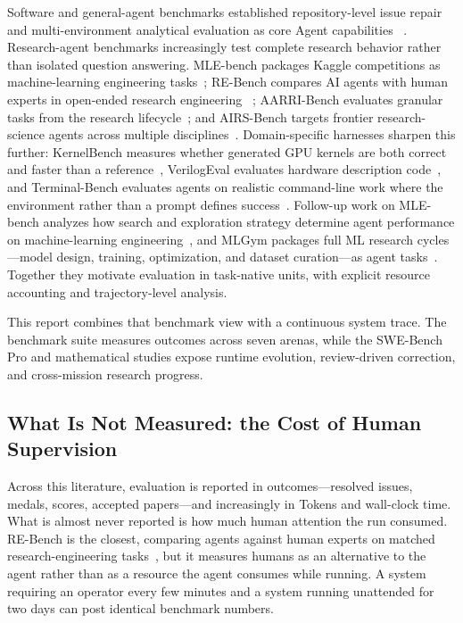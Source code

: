 Software and general-agent benchmarks established repository-level issue repair
and multi-environment analytical evaluation as core Agent capabilities
~\citep{jimenez2024swebench,liu2023agentbench,ma2024agentboard}.
Research-agent benchmarks increasingly test complete research behavior rather than
isolated question answering. MLE-bench packages Kaggle competitions as
machine-learning engineering tasks~\citep{chan2024mlebench}; RE-Bench compares AI
agents with human experts in open-ended research engineering
~\citep{wijk2024rebench}; AARRI-Bench evaluates granular tasks from the research
lifecycle~\citep{wang2026aarri}; and AIRS-Bench targets frontier research-science
agents across multiple disciplines~\citep{lupidi2026airsbench}. Domain-specific
harnesses sharpen this further: KernelBench measures whether generated GPU kernels
are both correct and faster than a reference~\citep{ouyang2025kernelbench},
VerilogEval evaluates hardware description code~\citep{liu2023verilogeval}, and
Terminal-Bench evaluates agents on realistic command-line work where the environment
rather than a prompt defines success~\citep{merrill2026terminalbench}. Follow-up work
on MLE-bench analyzes how search and exploration strategy determine agent
performance on machine-learning engineering~\citep{toledo2025mlebenchagents}, and
MLGym packages full ML research cycles---model design, training, optimization, and
dataset curation---as agent tasks~\citep{nathani2025mlgym}. Together they
motivate evaluation in task-native units, with explicit resource accounting and
trajectory-level analysis.

This report combines that benchmark view with a continuous system trace. The
benchmark suite measures outcomes across seven arenas, while the SWE-Bench Pro and
mathematical studies expose runtime evolution, review-driven correction, and
cross-mission research progress.

\subsection{What Is Not Measured: the Cost of Human Supervision}

Across this literature, evaluation is reported in outcomes---resolved issues, medals,
scores, accepted papers---and increasingly in Tokens and wall-clock time. What is
almost never reported is how much human attention the run consumed. RE-Bench is the
closest, comparing agents against human experts on matched research-engineering
tasks~\citep{wijk2024rebench}, but it measures humans as an alternative to the agent
rather than as a resource the agent consumes while running. A system requiring an
operator every few minutes and a system running unattended for two days can post
identical benchmark numbers.

